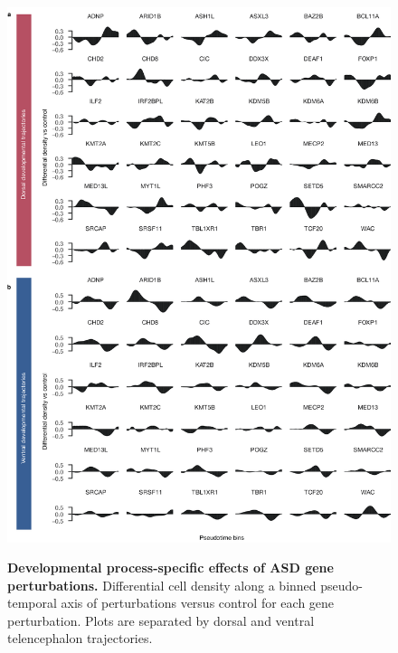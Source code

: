 \begin{figure}[h!]
    \centering
	\includegraphics[width=\textwidth]{figures/asd/Figure_S7}
    \label{fig:asdS7}
    \caption{\textbf{Developmental process-specific effects of ASD gene perturbations.} 
    Differential cell density along a binned pseudo-temporal axis of perturbations versus control for each gene perturbation. Plots are separated by dorsal and ventral telencephalon trajectories.}
\end{figure}



